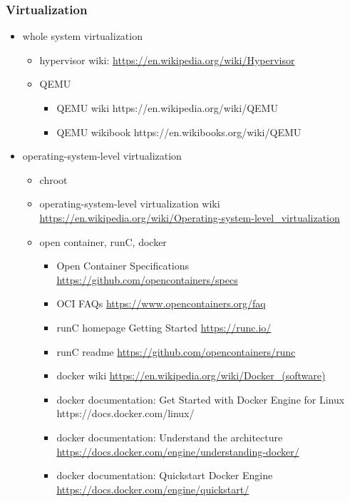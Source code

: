 \documentclass{article}
\begin{document}
\subsubsection{Virtualization}
%
\begin{itemize}
        \item whole system virtualization
            \begin{itemize}
                \item hypervisor wiki: \url{https://en.wikipedia.org/wiki/Hypervisor}
                \item QEMU
                    \begin{itemize}
                        \item QEMU wiki https://en.wikipedia.org/wiki/QEMU
                        \item QEMU wikibook https://en.wikibooks.org/wiki/QEMU
                    \end{itemize}
            \end{itemize}
        \item operating-system-level virtualization
            \begin{itemize}
                \item chroot
                \item operating-system-level virtualization wiki \url{https://en.wikipedia.org/wiki/Operating-system-level_virtualization}
                \item open container, runC, docker
                    \begin{itemize}
                        \item Open Container Specifications \url{https://github.com/opencontainers/specs}
                        \item OCI FAQs \url{https://www.opencontainers.org/faq}
                        \item runC homepage Getting Started \url{https://runc.io/}
                        \item runC readme \url{https://github.com/opencontainers/runc}
                        \item docker wiki \url{https://en.wikipedia.org/wiki/Docker_(software)}
                        \item docker documentation: Get Started with Docker Engine for Linux https://docs.docker.com/linux/
                        \item docker documentation: Understand the architecture \url{https://docs.docker.com/engine/understanding-docker/}
                        \item docker documentation: Quickstart Docker Engine \url{https://docs.docker.com/engine/quickstart/}
                    \end{itemize}
            \end{itemize}
\end{itemize}
%
\end{document}
